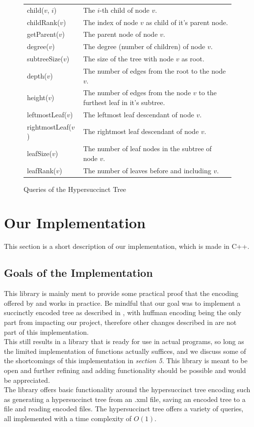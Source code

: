 \documentclass{article}
\begin{document}
\begin{figure}
\begin{tabular}{ |p{3.5cm}p{8cm}|} 
 \hline
 child($v$, $i$) & The $i$-th child of node $v$. \\
 childRank($v$) & The index of node $v$ as child of it's parent node. \\
 getParent($v$) & The parent node of node $v$. \\
 degree($v$) & The degree (number of children) of node $v$. \\
 subtreeSize($v$) & The size of the tree with node $v$ as root. \\
 depth($v$) &  The number of edges from the root to the node $v$. \\
 height($v$) & The number of edges from the node $v$ to the furthest leaf in it's subtree. \\
 leftmostLeaf($v$) & The leftmost leaf descendant of node $v$. \\
 rightmostLeaf($v$) & The rightmost leaf descendant of node $v$. \\
 leafSize($v$) & The number of leaf nodes in the subtree of node $v$. \\
 leafRank($v$) & The number of leaves before and including $v$. \\
 \hline
\end{tabular}
\caption{Queries of the Hypersuccinct Tree}
\label{2.1:table1}
\end{figure}

\section{Our Implementation}
This section is a short description of our implementation, which is made in C++.

\subsection{Goals of the Implementation}
This library is mainly ment to provide some practical proof that the encoding offered by \cite{farzanMunro} and \cite{universalSuccinct} works in practice. Be mindful that our goal was to implement a succinctly encoded tree as described in \cite{farzanMunro}, with huffman encoding being the only part from \cite{universalSuccinct} impacting our project, therefore other changes described in \cite{universalSuccinct} are not part of this implementation.\\
This still results in a library that is ready for use in actual programs, so long as the limited implementation of functions actually suffices, and we discuss some of the shortcomings of this implementation in \textit{section 5}. This library is meant to be open and further refining and adding functionality should be possible and would be appreciated.\\
The library offers basic functionality around the hypersuccinct tree encoding such as generating a hypersuccinct tree from an .xml file, saving an encoded tree to a file and reading encoded files. The hypersuccinct tree offers a variety of queries, all implemented with a time complexity of $O(1)$.
\end{document}
